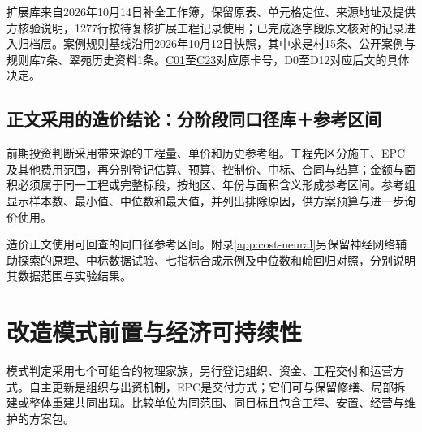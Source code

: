 \documentclass[UTF8,11pt,fontset=windows]{ctexart}
\begin{document}
扩展库来自2026年10月14日补全工作簿，保留原表、单元格定位、来源地址及提供方核验说明，1277行按待复核扩展工程记录使用；已完成逐字段原文核对的记录进入归档层。案例规则基线沿用2026年10月12日快照，其中求是村15条、公开案例与规则库7条、翠苑历史资料1条。\hyperlink{EXP-16120dfe-9d94-4394-8880-494b385cf2d2}{C01}至\hyperlink{EXP-1d56715f-f6b6-4e9f-8298-5ce656ee40c5}{C23}对应原卡号，D0至D12对应后文的具体决定。

\subsection{正文采用的造价结论：分阶段同口径库＋参考区间}

前期投资判断采用带来源的工程量、单价和历史参考组。工程先区分施工、EPC及其他费用范围，再分别登记估算、预算、控制价、中标、合同与结算；金额与面积必须属于同一工程或完整标段，按地区、年份与面积含义形成参考区间。参考组显示样本数、最小值、中位数和最大值，并列出排除原因，供方案预算与进一步询价使用。

造价正文使用可回查的同口径参考区间。附录\ref{app:cost-neural}另保留神经网络辅助探索的原理、中标数据试验、七指标合成示例及中位数和岭回归对照，分别说明其数据范围与实验结果。

\section{改造模式前置与经济可持续性}

模式判定采用七个可组合的物理家族，另行登记组织、资金、工程交付和运营方式。自主更新是组织与出资机制，EPC是交付方式；它们可与保留修缮、局部拆建或整体重建共同出现。比较单位为同范围、同目标且包含工程、安置、经营与维护的方案包。\cite{renewal2025,hzmode}
\end{document}
